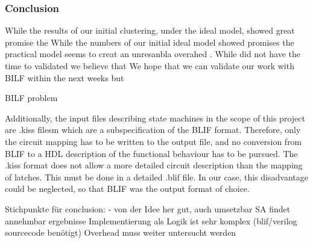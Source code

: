 \newpage
\subsubsection{Conclusion}
\label{subsubsec:Conclusion}

While the results of our initial clustering, under the ideal model, showed great promise the
While the numbers of our initial ideal model showed promises the practical model seems to creat an unresanbla overahed .
While did not have the time to validated we believe that  We hope that we can validate our work with BILF within the next weeks but 

BILF problem



Additionally, the input files describing state machines in the scope of this project are .kiss filesm which are a subspecification of the BLIF format. Therefore, only the circuit mapping has to be written to the output file, and no conversion from BLIF to a HDL description of the functional behaviour has to be pursued. The .kiss format does not allow a more detailed circuit description than the mapping of latches. This must be done in a detailed .blif file. In our case, this disadvantage could be neglected, so that BLIF was the output format of choice.

Stichpunkte für conclusion:
- von der Idee her gut, auch umsetzbar
SA findet annehmbar ergebnisse
Implementierung als Logik ist sehr komplex (blif/verilog sourcecode benötigt)
Overhead muss weiter untersucht werden


